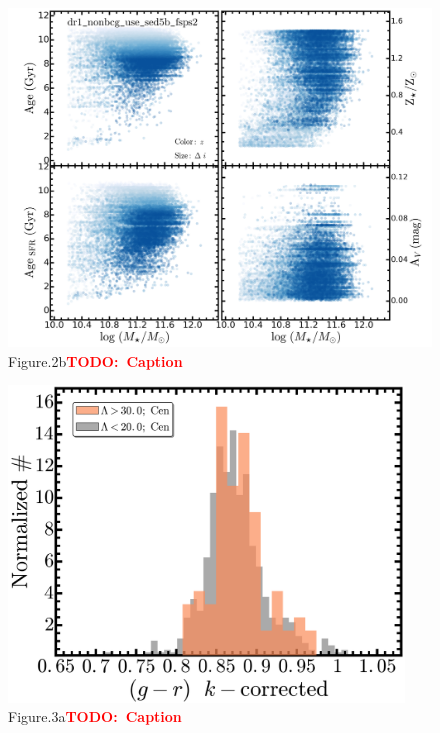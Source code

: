 \documentclass[preprint]{aastex}
\newcommand{\todo}[1]{\textcolor{red}{\textbf{TODO:~#1}}}
\begin{document}
\begin{CJK*}{UTF8}{gbsn}
\begin{figure}
    \centering 
    \includegraphics[width=11.5cm]{fig/dr1_nonbcg_use_sed5b_fsps2_logm_plots}
    \caption{Figure.2b\todo{Caption}}\label{figure:2b}
\end{figure}

\clearpage
{}
\begin{figure}
    \centering 
    \includegraphics[width=10.5cm]{fig/dr1_redbcg_isedfit_mass_fsps1_sbpsum_imgsub_use_grKcor_hist}
    \caption{Figure.3a\todo{Caption}}\label{figure:3a}
\end{figure}


\end{CJK*}
\end{document}
